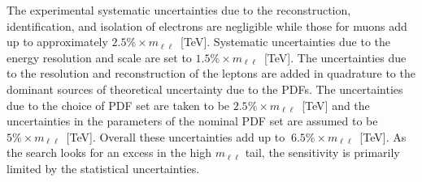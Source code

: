 The experimental systematic uncertainties due to the reconstruction, identification, and isolation
of electrons are negligible while those for muons add up to approximately $2.5\% \times m_{\ell\ell}$~[TeV]. 
Systematic uncertainties due to the energy resolution and scale are set to $1.5\% \times m_{\ell\ell}$~[TeV]. 
The uncertainties due to the resolution and reconstruction of the leptons are added in quadrature
to the dominant sources of theoretical uncertainty due to the PDFs. The uncertainties due to the choice of PDF set are taken to be 
$2.5\% \times m_{\ell\ell}$~[TeV] and the uncertainties in the parameters of the nominal PDF set are assumed
to be $5\% \times m_{\ell\ell}$~[TeV]. 
Overall these uncertainties add up to $~6.5\% \times m_{\ell\ell}$~[TeV].
As the search looks for an excess in the high $m_{\ell\ell}$ tail, the sensitivity is primarily
limited by the statistical uncertainties.

